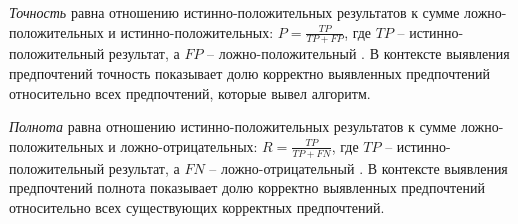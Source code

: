 		\begin{definition}
		\label{def:precision}
			\emph{Точность} равна отношению истинно-положительных результатов к сумме ложно-положительных и истинно-положительных: $P = \frac{TP}{TP + FP}$, где $TP$ – истинно-положительный результат, а $FP$ – ложно-положительный \cite[с.~155]{Manning:2008}. В контексте выявления предпочтений точность показывает долю корректно выявленных предпочтений относительно всех предпочтений, которые вывел алгоритм.
		\end{definition}

		\begin{definition}
		\label{def:recall}
			\emph{Полнота} равна отношению истинно-положительных результатов к сумме ложно-положительных и ложно-отрицательных: $R = \frac{TP}{TP + FN}$, где $TP$ – истинно-положительный результат, а $FN$ – ложно-отрицательный \cite[с.~155]{Manning:2008}. В контексте выявления предпочтений полнота показывает долю корректно выявленных предпочтений относительно всех существующих корректных предпочтений.
		\end{definition}
		
